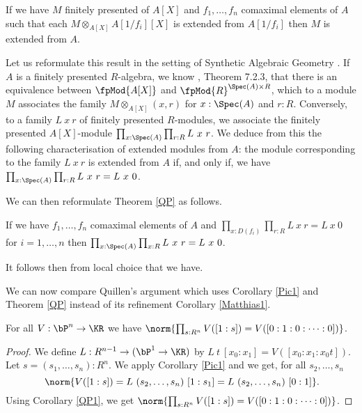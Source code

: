\begin{theorem}\label{QP}
  If we have $M$ finitely presented of $A[X]$ and $f_1,\dots,f_n$ comaximal elements of $A$
  such that each $M\otimes_{A[X]} A[1/f_i][X]$ is extended from $A[1/f_i]$ then $M$ is extended from $A$.
\end{theorem}

Let us reformulate this result in the setting of Synthetic Algebraic Geometry \cite{draft}.
If $A$ is a finitely presented $R$-algebra, we know \cite{draft}, Theorem 7.2.3, that there is an
equivalence between $\fpMod{A[X]}$ and ${\fpMod{R}}^{\Spec(A)\times R}$, which to a module $M$
associates the family $M\otimes_{A[X]} (x,r)$ for $x:\Spec(A)$ and $r:R$. Conversely, to a family $L~x~r$
of finitely presented $R$-modules, we associate the finitely presented $A[X]$-module $\prod_{x:\Spec(A)}\prod_{r:R}L~x~r$.
We deduce from this the following characterisation of extended modules from $A$: the module corresponding to the
family $L~x~r$ is extended from $A$ if, and only if, we have $\prod_{x:\Spec(A)}\prod_{r:R}L~x~r = L~x~0$.

We can then reformulate Theorem \ref{QP} as follows.

\begin{corollary}
  If we have $f_1,\dots,f_n$ comaximal elements of $A$ and $\prod_{x:D(f_i)}\prod_{r:R}L~x~r = L~x~0$ for $i=1,\dots, n$
  then $\prod_{x:\Spec(A)}\prod_{x:R}L~x~r = L~x~0$.
\end{corollary}

It follows then from local choice that we have.

\begin{corollary}\label{QP1}
  If we have $\prod_{x:\Spec(A)}\norm{\prod_{r:R}L~x~r = L~x~0}$ then we have $\norm{\prod_{x:\Spec(A)}\prod_{x:R}L~x~r = L~x~0$.
\end{corollary}

We can now compare Quillen's argument which uses Corollary \ref{Pic1} and Theorem \ref{QP}
instead of its refinement Corollary \ref{Matthias1}.

\begin{proposition}\label{trivial}
  For all $V:\bP^n\rightarrow \KR$ we have $\norm{\prod_{s:R^n}V([1:s]) = V([0:1:0:\cdots :0])}$.
\end{proposition}

\begin{proof}
  We define $L:R^{n-1}\rightarrow (\bP^1 \to \KR)$ by $L~t~[x_0:x_1] = V([x_0:x_1:x_0t])$.
  Let $s=(s_1,\dots,s_{n}):R^{n}$. We apply Corollary \ref{Pic1} and we get, for all $s_2,\dots,s_n$
  \[
   \norm{V([1:s]) = L~(s_2,\dots,s_n)~[1:s_1] = L~(s_2,\dots,s_n)~[0:1]}
   \rlap{.}
   \]
   Using Corollary \ref{QP1}, we get $\norm{\prod_{s:R^n}V([1:s]) = V([0:1:0:\cdots :0])}$.
\end{proof}








